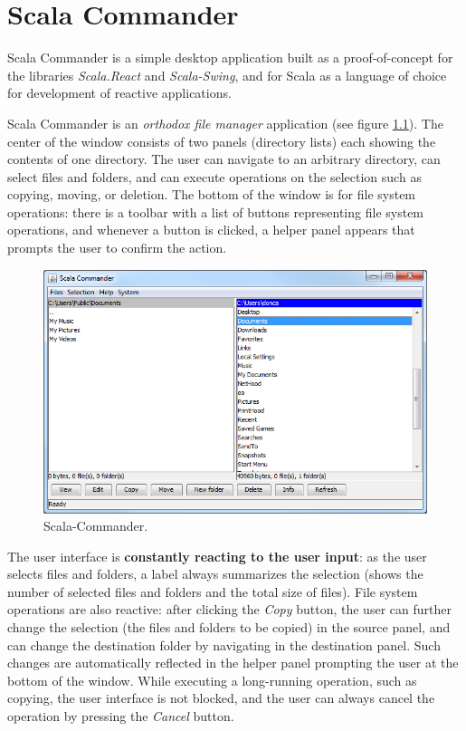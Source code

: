

\chapter{Scala Commander}\label{chap:impl_scala-commander}

Scala Commander is a simple desktop application built as a proof-of-concept for the libraries \emph{Scala.React} and \emph{Scala-Swing}, and for Scala as a language of choice for development of reactive applications.

Scala Commander is an \emph{orthodox file manager} application (see figure \ref{fig:scomm_main}). The center of the window consists of two panels (directory lists) each showing the contents of one directory. The user can navigate to an arbitrary directory, can select files and folders, and can execute operations on the selection such as copying, moving, or deletion. The bottom of the window is for file system operations: there is a toolbar with a list of buttons representing file system operations, and whenever a button is clicked, a helper panel appears that prompts the user to confirm the action.

\begin{figure}[h!] 
  \centering
    \includegraphics[width=1\textwidth]{images/scala-commander-main.png}
  \caption{Scala-Commander.}
  \label{fig:scomm_main}  
\end{figure}

The user interface is \textbf{constantly reacting to the user input}: as the user selects files and folders, a label always summarizes the selection (shows the number of selected files and folders and the total size of files). File system operations are also reactive: after clicking the \emph{Copy} button, the user can further change the selection (the files and folders to be copied) in the source panel, and can change the destination folder by navigating in the destination panel. Such changes are automatically reflected in the helper panel prompting the user at the bottom of the window. While executing a long-running operation, such as copying, the user interface is not blocked, and the user can always cancel the operation by pressing the \emph{Cancel} button.

